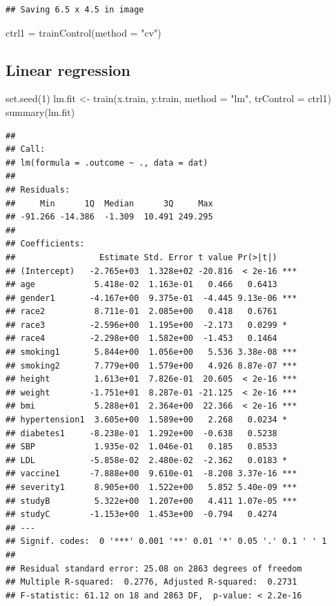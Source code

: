 \documentclass[
]{article}
\newenvironment{Shaded}{\begin{snugshade}}{\end{snugshade}}
\newcommand{\AttributeTok}[1]{\textcolor[rgb]{0.77,0.63,0.00}{#1}}
\newcommand{\DecValTok}[1]{\textcolor[rgb]{0.00,0.00,0.81}{#1}}
\newcommand{\FunctionTok}[1]{\textcolor[rgb]{0.00,0.00,0.00}{#1}}
\newcommand{\NormalTok}[1]{#1}
\newcommand{\OtherTok}[1]{\textcolor[rgb]{0.56,0.35,0.01}{#1}}
\newcommand{\StringTok}[1]{\textcolor[rgb]{0.31,0.60,0.02}{#1}}
\begin{document}
\begin{verbatim}
## Saving 6.5 x 4.5 in image
\end{verbatim}

\begin{Shaded}
\begin{Highlighting}[]
\NormalTok{ctrl1 }\OtherTok{=} \FunctionTok{trainControl}\NormalTok{(}\AttributeTok{method =} \StringTok{"cv"}\NormalTok{)}
\end{Highlighting}
\end{Shaded}

\hypertarget{linear-regression}{%
\subsection{Linear regression}\label{linear-regression}}

\begin{Shaded}
\begin{Highlighting}[]
\FunctionTok{set.seed}\NormalTok{(}\DecValTok{1}\NormalTok{)}
\NormalTok{lm.fit }\OtherTok{\textless{}{-}} \FunctionTok{train}\NormalTok{(x.train, y.train,}
                \AttributeTok{method =} \StringTok{"lm"}\NormalTok{,}
                \AttributeTok{trControl =}\NormalTok{ ctrl1)}
\FunctionTok{summary}\NormalTok{(lm.fit)}
\end{Highlighting}
\end{Shaded}

\begin{verbatim}
## 
## Call:
## lm(formula = .outcome ~ ., data = dat)
## 
## Residuals:
##     Min      1Q  Median      3Q     Max 
## -91.266 -14.386  -1.309  10.491 249.295 
## 
## Coefficients:
##                 Estimate Std. Error t value Pr(>|t|)    
## (Intercept)   -2.765e+03  1.328e+02 -20.816  < 2e-16 ***
## age            5.418e-02  1.163e-01   0.466   0.6413    
## gender1       -4.167e+00  9.375e-01  -4.445 9.13e-06 ***
## race2          8.711e-01  2.085e+00   0.418   0.6761    
## race3         -2.596e+00  1.195e+00  -2.173   0.0299 *  
## race4         -2.298e+00  1.582e+00  -1.453   0.1464    
## smoking1       5.844e+00  1.056e+00   5.536 3.38e-08 ***
## smoking2       7.779e+00  1.579e+00   4.926 8.87e-07 ***
## height         1.613e+01  7.826e-01  20.605  < 2e-16 ***
## weight        -1.751e+01  8.287e-01 -21.125  < 2e-16 ***
## bmi            5.288e+01  2.364e+00  22.366  < 2e-16 ***
## hypertension1  3.605e+00  1.589e+00   2.268   0.0234 *  
## diabetes1     -8.238e-01  1.292e+00  -0.638   0.5238    
## SBP            1.935e-02  1.046e-01   0.185   0.8533    
## LDL           -5.858e-02  2.480e-02  -2.362   0.0183 *  
## vaccine1      -7.888e+00  9.610e-01  -8.208 3.37e-16 ***
## severity1      8.905e+00  1.522e+00   5.852 5.40e-09 ***
## studyB         5.322e+00  1.207e+00   4.411 1.07e-05 ***
## studyC        -1.153e+00  1.453e+00  -0.794   0.4274    
## ---
## Signif. codes:  0 '***' 0.001 '**' 0.01 '*' 0.05 '.' 0.1 ' ' 1
## 
## Residual standard error: 25.08 on 2863 degrees of freedom
## Multiple R-squared:  0.2776, Adjusted R-squared:  0.2731 
## F-statistic: 61.12 on 18 and 2863 DF,  p-value: < 2.2e-16
\end{verbatim}
\end{document}
